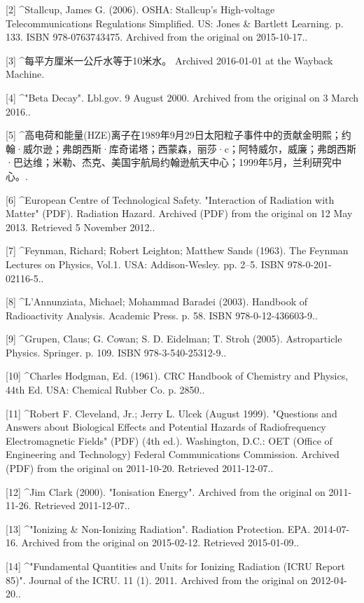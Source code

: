 [2]
^Stallcup, James G. (2006). OSHA: Stallcup's High-voltage Telecommunications Regulations Simplified. US: Jones & Bartlett Learning. p. 133. ISBN 978-0763743475. Archived from the original on 2015-10-17..

[3]
^每平方厘米一公斤水等于10米水。 Archived 2016-01-01 at the Wayback Machine.

[4]
^"Beta Decay". Lbl.gov. 9 August 2000. Archived from the original on 3 March 2016..

[5]
^高电荷和能量(HZE)离子在1989年9月29日太阳粒子事件中的贡献金明熙；约翰·威尔逊；弗朗西斯·库奇诺塔；西蒙森，丽莎·c；阿特威尔，威廉；弗朗西斯·巴达维；米勒、杰克、美国宇航局约翰逊航天中心；1999年5月，兰利研究中心。.

[6]
^European Centre of Technological Safety. "Interaction of Radiation with Matter" (PDF). Radiation Hazard. Archived (PDF) from the original on 12 May 2013. Retrieved 5 November 2012..

[7]
^Feynman, Richard; Robert Leighton; Matthew Sands (1963). The Feynman Lectures on Physics, Vol.1. USA: Addison-Wesley. pp. 2–5. ISBN 978-0-201-02116-5..

[8]
^L'Annunziata, Michael; Mohammad Baradei (2003). Handbook of Radioactivity Analysis. Academic Press. p. 58. ISBN 978-0-12-436603-9..

[9]
^Grupen, Claus; G. Cowan; S. D. Eidelman; T. Stroh (2005). Astroparticle Physics. Springer. p. 109. ISBN 978-3-540-25312-9..

[10]
^Charles Hodgman, Ed. (1961). CRC Handbook of Chemistry and Physics, 44th Ed. USA: Chemical Rubber Co. p. 2850..

[11]
^Robert F. Cleveland, Jr.; Jerry L. Ulcek (August 1999). "Questions and Answers about Biological Effects and Potential Hazards of Radiofrequency Electromagnetic Fields" (PDF) (4th ed.). Washington, D.C.: OET (Office of Engineering and Technology) Federal Communications Commission. Archived (PDF) from the original on 2011-10-20. Retrieved 2011-12-07..

[12]
^Jim Clark (2000). "Ionisation Energy". Archived from the original on 2011-11-26. Retrieved 2011-12-07..

[13]
^"Ionizing & Non-Ionizing Radiation". Radiation Protection. EPA. 2014-07-16. Archived from the original on 2015-02-12. Retrieved 2015-01-09..

[14]
^"Fundamental Quantities and Units for Ionizing Radiation (ICRU Report 85)". Journal of the ICRU. 11 (1). 2011. Archived from the original on 2012-04-20..

